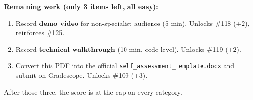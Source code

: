 \documentclass[11pt]{article}
\begin{document}
\medskip
\noindent\textbf{Remaining work (only 3 items left, all easy):}
\begin{enumerate}
\item Record \textbf{demo video} for non-specialist audience (5 min). Unlocks \#118 (+2), reinforces \#125.
\item Record \textbf{technical walkthrough} (10 min, code-level). Unlocks \#119 (+2).
\item Convert this PDF into the official \texttt{self\_assessment\_template.docx} and submit on Gradescope. Unlocks \#109 (+3).
\end{enumerate}

\noindent After those three, the score is at the cap on every category.
\end{document}
